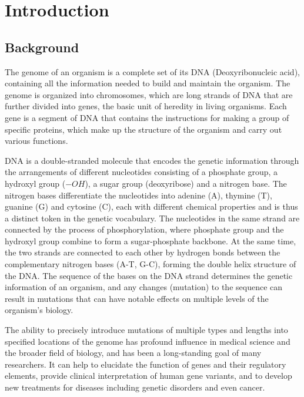 \chapter{Introduction}

\minitoc

\section{Background}

The genome of an organism is a complete set of its DNA (Deoxyribonucleic acid), containing all the information needed to build and maintain the organism. The genome is organized into chromosomes, which are long strands of DNA that are further divided into genes, the basic unit of heredity in living organisms. Each gene is a segment of DNA  that contains the instructions for making a group of specific proteins, which make up the structure of the organism and carry out various functions\cite{BrockBiologyMicroorganisms}.

DNA is a double-stranded molecule that encodes the genetic information through the arrangements of different nucleotides consisting of a phosphate group, a hydroxyl group ($-OH$), a sugar group (deoxyribose) and a nitrogen base. The nitrogen bases differentiate the nucleotides into adenine (A), thymine (T), guanine (G) and cytosine (C), each with different chemical properties and is thus a distinct token in the genetic vocabulary. The nucleotides in the same strand are connected by the process of phosphorylation, where phosphate group and the hydroxyl group combine to form a sugar-phosphate backbone. At the same time, the two strands are connected to each other by hydrogen bonds between the complementary nitrogen bases (A-T, G-C), forming the double helix structure of the DNA. The sequence of the bases on the DNA strand determines the genetic information of an organism, and any changes (mutation) to the sequence can result in mutations that can have notable effects on multiple levels of the organism's biology\cite{BrockBiologyMicroorganisms}.

The ability to precisely introduce mutations of multiple types and lengths into specified locations of the genome has profound influence in medical science and the broader field of biology, and has been a long-standing goal of many researchers. It can help to elucidate the function of genes and their regulatory elements, provide clinical interpretation of human gene variants, and to develop new treatments for diseases including genetic disorders and even cancer\cite{petraityteGenomeEditingMedicine2021,dasCRISPRBasedTherapeutics2022,portoBaseEditingAdvances2020}. 

